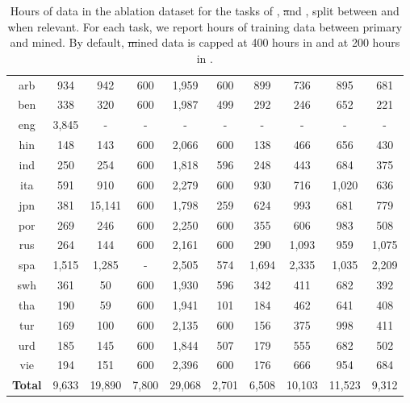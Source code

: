 \begin{table}[!hb]
\begin{tabular}{@{}cccccccccc@{}}
    \midrule
    arb & 934 
        & 942 & 600 
        & 1,959 & 600 
        & 899  & 736 
        & 895 & 681 \\
    ben & 338 
        & 320 & 600 
        & 1,987 & 499 
        & 292 & 246 
        & 652 & 221 \\
    eng & 3,845 & - & - &-  & - & - & - & - & - \\
    hin & 148 
        & 143 & 600 
        & 2,066 & 600 
        & 138 & 466 
        & 656 & 430 \\
    ind & 250 
        & 254 & 600 
        & 1,818 & 596 
        & 248 & 443 
        & 684 & 375 \\
    ita & 591 
    & 910 & 600 
    & 2,279 & 600 
    & 930 & 716 
    & 1,020 & 636 \\
    jpn & 381 
        & 15,141 & 600 
        & 1,798 & 259 
        & 624 & 993 
        & 681 & 779 \\
    por & 269 
        & 246 & 600 
        & 2,250 & 600 
        & 355 & 606 
        & 983 & 508 \\
    rus & 264 
        & 144 & 600 
        & 2,161 & 600 
        & 290 & 1,093 
        & 959 & 1,075 \\
    spa & 1,515 
        & 1,285 & - 
        & 2,505 & 574 
        & 1,694 & 2,335 
        & 1,035 & 2,209 \\
    swh & 361 
        & 50 & 600 
        & 1,930 & 596 
        & 342 & 411 
        & 682 & 392 \\
    tha & 190 
        & 59 & 600 
        & 1,941 & 101 
        & 184 & 462 
        & 641 & 408 \\
    tur & 169 
        & 100 & 600 
        & 2,135 & 600 
        & 156 & 375 
        & 998 & 411 \\
    urd & 185 
        & 145 & 600 
        & 1,844 & 507 
        & 179 & 555 
        & 682 & 502 \\
    vie & 194 
        & 151 & 600 
        & 2,396 & 600 
        & 176 & 666 
        & 954 & 684 \\
    \midrule
    \bf Total & 9,633  & 19,890 & 7,800 & 29,068 & 2,701 & 6,508 & 10,103 & 11,523 & 9,312 \\
    \bottomrule
\end{tabular}
\caption{Hours of data in the ablation dataset for the tasks of \asr, \st and \sst, split between \engx and \xeng when relevant. For each task, we report hours of training data between primary and mined. By default, \st mined data is capped at 400 hours in \xeng and at 200 hours in \engx.
}\label{tbl:s2t-ablation-dataset}
\end{table}
 
